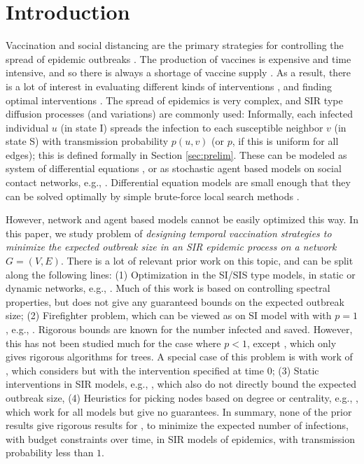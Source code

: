\section{Introduction}
\label{sec:intro}

Vaccination and social distancing are the primary strategies for controlling the spread of epidemic outbreaks
\cite{medlock:science09,Ogura2017,halloran:pnas08,lofgren:pnas14,zhang2015controlling,YaoSDM2014,AAAI1816714,PreciadoVM13_2,PreciadoVM13,PreciadoVM14,Aspnes:2005}.
The production of vaccines is expensive and time intensive, and so there is always a shortage of
vaccine supply \cite{cdc:temporal}. As a result, there is a lot of interest in evaluating different kinds of
interventions \cite{halloran:pnas08,lofgren:pnas14}, and finding optimal interventions \cite{medlock:science09}.
The spread of epidemics is very complex, and SIR type diffusion processes (and variations) are commonly used:
Informally, each infected individual $u$ (in state I) spreads the infection to each susceptible neighbor $v$ 
(in state S) with transmission probability $p(u, v)$ (or $p$, if this is uniform for all edges); 
this is defined formally in Section \ref{sec:prelim}.
These can be modeled as system of differential equations \cite{medlock:science09,AAAI1816714,venkataramanan:ichi17}, or as stochastic
agent based models on social contact networks, e.g., \cite{marathe:cacm13}.
Differential equation models are small enough that they can be solved optimally by simple brute-force
local search methods \cite{medlock:science09}.

However, network and agent based models cannot be easily optimized this way. 
In this paper, we study problem \prob{} of \emph{designing temporal vaccination strategies to minimize
the expected outbreak size in an SIR epidemic process on a network $G=(V, E)$}.
There is a lot of relevant prior work on this topic, and can be split along the following lines:
(1) Optimization in the SI/SIS type models, in static or dynamic networks, e.g.,
\cite{PreciadoVM13_2,PreciadoVM13,PreciadoVM14,SahaSDM15,Ogura2017}. Much of this work is based on
controlling spectral properties, but does not give any guaranteed bounds on the expected outbreak size;
(2) Firefighter problem, which can be viewed as \prob{} on SI model with with $p=1$, e.g.,
\cite{anshelevich09,Finbow2009TheFP}. Rigorous bounds are known for the number infected and saved.
However, this has not been studied much for the case where $p<1$, except \cite{DBLP:journals/corr/abs-1711-08237},
which only gives rigorous algorithms for trees.
A special case of this problem is with work of \cite{Aspnes:2005}, which considers \prob{} but with
the intervention specified at time 0;
(3) Static interventions in SIR models, e.g., \cite{zhang2015controlling,YaoSDM2014}, which also do not
directly bound the expected outbreak size,
(4) Heuristics for picking nodes based on degree or centrality, e.g., \cite{PhysRevLett.91.247901,Miller2007EffectiveVS},
which work for all models but give no guarantees.
In summary, none of the prior results give rigorous results for \prob{}, to minimize the expected
number of infections, with budget constraints over time, in SIR models of epidemics, with transmission probability less than $1$.

